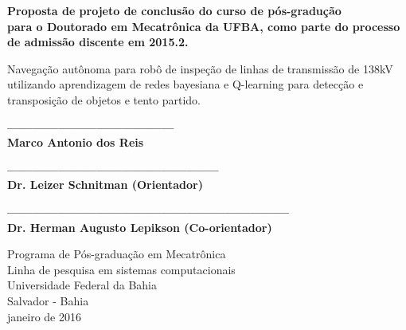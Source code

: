 \begin{center}
  \vspace*{0.8cm}
  {\Large \bf Proposta de projeto de conclusão do curso de pós-gradução \\
  para o Doutorado em Mecatrônica da UFBA, como parte do processo de admissão discente em 2015.2.}

  \vspace*{2.5cm}

  {\Large Navegação autônoma para robô de inspeção de linhas de transmissão de 138kV utilizando aprendizagem de redes bayesiana e Q-learning para detecção e transposição de objetos e tento partido.}
  \vspace*{2.5cm}
  
  {\bf ---------------------------------------\\
  Marco Antonio dos Reis}
  
  \vspace*{1.5cm}
  {\bf --------------------------------------------------\\
  Dr. Leizer Schnitman (Orientador)}
  
   \vspace*{1.5cm}
  {\bf ------------------------------------------------------------------\\
  Dr. Herman Augusto Lepikson (Co-orientador)}
  
   \begin{center}
   \end{center}
	\vspace*{0.3cm}

  {Programa de Pós-graduação em Mecatrônica\\
          [-3mm] Linha de pesquisa em sistemas computacionais\\
          [-3mm] Universidade Federal da Bahia\\
          [-3mm] Salvador - Bahia\\
          [-3mm] janeiro de 2016}
\end{center}

\newpage
\thispagestyle{empty}
\begin{center}
 \vspace*{2cm}
\end{center}


